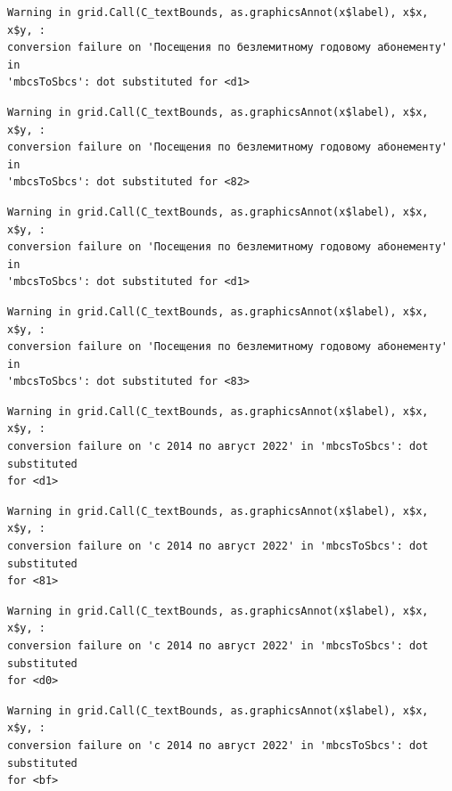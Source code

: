 \documentclass[
  letterpaper,
  DIV=11,
  numbers=noendperiod]{scrartcl}
\begin{document}
\begin{verbatim}
Warning in grid.Call(C_textBounds, as.graphicsAnnot(x$label), x$x, x$y, :
conversion failure on 'Посещения по безлемитному годовому абонементу' in
'mbcsToSbcs': dot substituted for <d1>
\end{verbatim}

\begin{verbatim}
Warning in grid.Call(C_textBounds, as.graphicsAnnot(x$label), x$x, x$y, :
conversion failure on 'Посещения по безлемитному годовому абонементу' in
'mbcsToSbcs': dot substituted for <82>
\end{verbatim}

\begin{verbatim}
Warning in grid.Call(C_textBounds, as.graphicsAnnot(x$label), x$x, x$y, :
conversion failure on 'Посещения по безлемитному годовому абонементу' in
'mbcsToSbcs': dot substituted for <d1>
\end{verbatim}

\begin{verbatim}
Warning in grid.Call(C_textBounds, as.graphicsAnnot(x$label), x$x, x$y, :
conversion failure on 'Посещения по безлемитному годовому абонементу' in
'mbcsToSbcs': dot substituted for <83>
\end{verbatim}

\begin{verbatim}
Warning in grid.Call(C_textBounds, as.graphicsAnnot(x$label), x$x, x$y, :
conversion failure on 'с 2014 по август 2022' in 'mbcsToSbcs': dot substituted
for <d1>
\end{verbatim}

\begin{verbatim}
Warning in grid.Call(C_textBounds, as.graphicsAnnot(x$label), x$x, x$y, :
conversion failure on 'с 2014 по август 2022' in 'mbcsToSbcs': dot substituted
for <81>
\end{verbatim}

\begin{verbatim}
Warning in grid.Call(C_textBounds, as.graphicsAnnot(x$label), x$x, x$y, :
conversion failure on 'с 2014 по август 2022' in 'mbcsToSbcs': dot substituted
for <d0>
\end{verbatim}

\begin{verbatim}
Warning in grid.Call(C_textBounds, as.graphicsAnnot(x$label), x$x, x$y, :
conversion failure on 'с 2014 по август 2022' in 'mbcsToSbcs': dot substituted
for <bf>
\end{verbatim}
\end{document}
